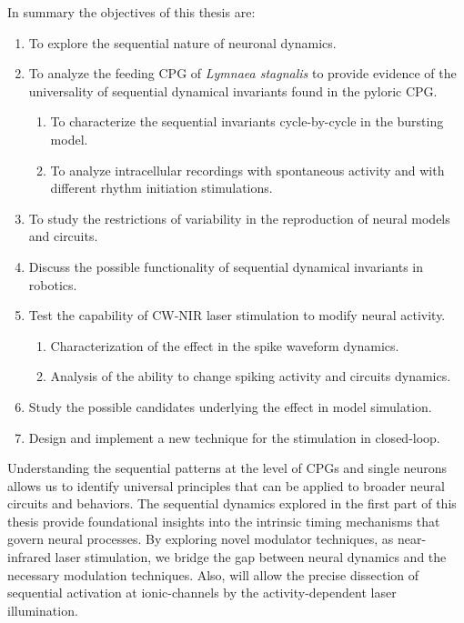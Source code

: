 In summary the objectives of this thesis are:
\begin{enumerate}
    \item To explore the sequential nature of neuronal dynamics. 
    \item To analyze the feeding CPG of \textit{Lymnaea stagnalis} to provide evidence of the universality of sequential dynamical invariants found in the pyloric CPG.
    \begin{enumerate}
        \item To characterize the sequential invariants cycle-by-cycle in the bursting model. 
        \item To analyze intracellular recordings with spontaneous activity and with different rhythm initiation stimulations. 
    \end{enumerate}
    \item To study the restrictions of variability in the reproduction of neural models and circuits.
    \item Discuss the possible functionality of sequential dynamical invariants in robotics. 
    \item Test the capability of CW-NIR laser stimulation to modify neural activity. 
    \begin{enumerate}
        \item Characterization of the effect in the spike waveform dynamics. 
        \item Analysis of the ability to change spiking activity and circuits dynamics. 
    \end{enumerate}
    \item Study the possible candidates underlying the effect in model simulation. 
    \item Design and implement a new technique for the stimulation in closed-loop. 
\end{enumerate}

Understanding the sequential patterns at the level of CPGs and single neurons allows us to identify universal principles that can be applied to broader neural circuits and behaviors. The sequential dynamics explored in the first part of this thesis provide foundational insights into the intrinsic timing mechanisms that govern neural processes. By exploring novel modulator techniques, as near-infrared laser stimulation, we bridge the gap between neural dynamics and the necessary modulation techniques. Also, will allow the precise dissection of sequential activation at ionic-channels by the activity-dependent laser illumination. 

